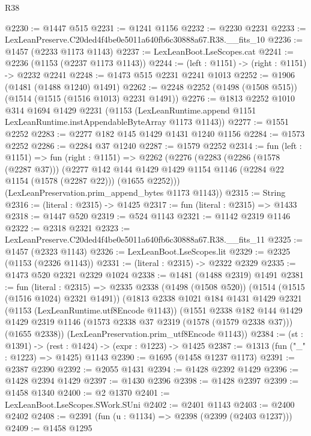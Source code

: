 \begin{lexlean}{R38}
\begin{coremodule}
@2230 := @1447 @515
@2231 := @1241 @1156
@2232 := @2230 @2231
@2233 := LexLeanPreserve.C20ded4f4be0e5011a640fb6c30888a67.R38.__fits_10
@2236 := @1457 (@2233 @1173 @1143)
@2237 := LexLeanBoot.LseScopes.cat
@2241 := @2236 (@1153 (@2237 @1173 @1143))
@2244 := (left : @1151) -> (right : @1151) -> @2232 @2241
@2248 := @1473 @515 @2231 @2241 @1013
@2252 := @1906 (@1481 (@1488 @1240) @1491)
@2262 := @2248 @2252 (@1498 (@1508 @515)) (@1514 (@1515 (@1516 @1013) @2231 @1491))
@2276 := @1813
    @2252
    @1010
    @314
    @1694
    @1429
    @2231
    (@1153 (LexLeanRuntime.append @1151 LexLeanRuntime.instAppendableByteArray @1173 @1143))
@2277 := @1551 @2252
@2283 := @2277 @182 @145 @1429 @1431 @1240 @1156
@2284 := @1573 @2252
@2286 := @2284 @37 @1240
@2287 := @1579 @2252
@2314 := fun (left : @1151) =>
  fun (right : @1151) =>
  @2262
    (@2276
      (@2283
        (@2286 (@1578 (@2287 @37)))
        (@2277
          @142
          @144
          @1429
          @1429
          @1154
          @1146
          (@2284 @22 @1154 (@1578 (@2287 @22)))
          (@1655 @2252)))
      (LexLeanPreservation.prim_append_bytes @1173 @1143))
@2315 := String
@2316 := (literal : @2315) -> @1425
@2317 := fun (literal : @2315) => @1433
@2318 := @1447 @520
@2319 := @524 @1143
@2321 := @1142 @2319 @1146
@2322 := @2318 @2321
@2323 := LexLeanPreserve.C20ded4f4be0e5011a640fb6c30888a67.R38.__fits_11
@2325 := @1457 (@2323 @1143)
@2326 := LexLeanBoot.LseScopes.lit
@2329 := @2325 (@1153 (@2326 @1143))
@2331 := (literal : @2315) -> @2322 @2329
@2335 := @1473 @520 @2321 @2329 @1024
@2338 := @1481 (@1488 @2319) @1491
@2381 := fun (literal : @2315) =>
  @2335
    @2338
    (@1498 (@1508 @520))
    (@1514 (@1515 (@1516 @1024) @2321 @1491))
    (@1813
      @2338
      @1021
      @184
      @1431
      @1429
      @2321
      (@1153 (LexLeanRuntime.utf8Encode @1143))
      (@1551
        @2338
        @182
        @144
        @1429
        @1429
        @2319
        @1146
        (@1573 @2338 @37 @2319 (@1578 (@1579 @2338 @37)))
        (@1655 @2338))
      (LexLeanPreservation.prim_utf8Encode @1143))
@2384 := (st : @1391) -> (rest : @1424) -> (expr : @1223) -> @1425
@2387 := @1313 (fun ("_" : @1223) => @1425) @1143
@2390 := @1695 (@1458 @1237 @1173)
@2391 := @2387 @2390
@2392 := @2055 @1431
@2394 := @1428 @2392 @1429
@2396 := @1428 @2394 @1429
@2397 := @1430 @2396
@2398 := @1428 @2397
@2399 := @1458 @1340
@2400 := @2 @1370
@2401 := LexLeanBoot.LseScopes.SWork.SUni
@2402 := @2401 @1143
@2403 := @2400 @2402
@2408 := @2391 (fun (u : @1134) => @2398 (@2399 (@2403 @1237)))
@2409 := @1458 @1295

\end{coremodule}
\end{lexlean}

